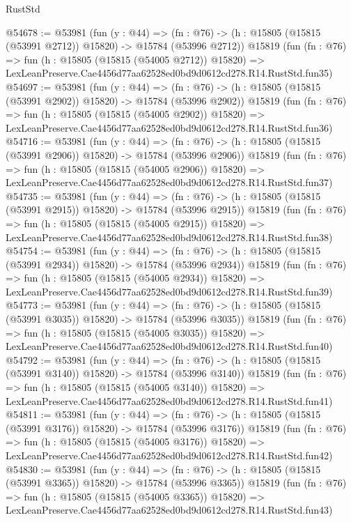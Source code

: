 \begin{lexlean}{RustStd}
\begin{coremodule}
@54678 := @53981
    (fun (y : @44) =>
    (fn : @76) -> (h : @15805 (@15815 (@53991 @2712)) @15820) -> @15784 (@53996 @2712))
    @15819
    (fun (fn : @76) =>
    fun (h : @15805 (@15815 (@54005 @2712)) @15820) =>
    LexLeanPreserve.Cae4456d77aa62528ed0bd9d0612cd278.R14.RustStd.fun35)
@54697 := @53981
    (fun (y : @44) =>
    (fn : @76) -> (h : @15805 (@15815 (@53991 @2902)) @15820) -> @15784 (@53996 @2902))
    @15819
    (fun (fn : @76) =>
    fun (h : @15805 (@15815 (@54005 @2902)) @15820) =>
    LexLeanPreserve.Cae4456d77aa62528ed0bd9d0612cd278.R14.RustStd.fun36)
@54716 := @53981
    (fun (y : @44) =>
    (fn : @76) -> (h : @15805 (@15815 (@53991 @2906)) @15820) -> @15784 (@53996 @2906))
    @15819
    (fun (fn : @76) =>
    fun (h : @15805 (@15815 (@54005 @2906)) @15820) =>
    LexLeanPreserve.Cae4456d77aa62528ed0bd9d0612cd278.R14.RustStd.fun37)
@54735 := @53981
    (fun (y : @44) =>
    (fn : @76) -> (h : @15805 (@15815 (@53991 @2915)) @15820) -> @15784 (@53996 @2915))
    @15819
    (fun (fn : @76) =>
    fun (h : @15805 (@15815 (@54005 @2915)) @15820) =>
    LexLeanPreserve.Cae4456d77aa62528ed0bd9d0612cd278.R14.RustStd.fun38)
@54754 := @53981
    (fun (y : @44) =>
    (fn : @76) -> (h : @15805 (@15815 (@53991 @2934)) @15820) -> @15784 (@53996 @2934))
    @15819
    (fun (fn : @76) =>
    fun (h : @15805 (@15815 (@54005 @2934)) @15820) =>
    LexLeanPreserve.Cae4456d77aa62528ed0bd9d0612cd278.R14.RustStd.fun39)
@54773 := @53981
    (fun (y : @44) =>
    (fn : @76) -> (h : @15805 (@15815 (@53991 @3035)) @15820) -> @15784 (@53996 @3035))
    @15819
    (fun (fn : @76) =>
    fun (h : @15805 (@15815 (@54005 @3035)) @15820) =>
    LexLeanPreserve.Cae4456d77aa62528ed0bd9d0612cd278.R14.RustStd.fun40)
@54792 := @53981
    (fun (y : @44) =>
    (fn : @76) -> (h : @15805 (@15815 (@53991 @3140)) @15820) -> @15784 (@53996 @3140))
    @15819
    (fun (fn : @76) =>
    fun (h : @15805 (@15815 (@54005 @3140)) @15820) =>
    LexLeanPreserve.Cae4456d77aa62528ed0bd9d0612cd278.R14.RustStd.fun41)
@54811 := @53981
    (fun (y : @44) =>
    (fn : @76) -> (h : @15805 (@15815 (@53991 @3176)) @15820) -> @15784 (@53996 @3176))
    @15819
    (fun (fn : @76) =>
    fun (h : @15805 (@15815 (@54005 @3176)) @15820) =>
    LexLeanPreserve.Cae4456d77aa62528ed0bd9d0612cd278.R14.RustStd.fun42)
@54830 := @53981
    (fun (y : @44) =>
    (fn : @76) -> (h : @15805 (@15815 (@53991 @3365)) @15820) -> @15784 (@53996 @3365))
    @15819
    (fun (fn : @76) =>
    fun (h : @15805 (@15815 (@54005 @3365)) @15820) =>
    LexLeanPreserve.Cae4456d77aa62528ed0bd9d0612cd278.R14.RustStd.fun43)

\end{coremodule}
\end{lexlean}

